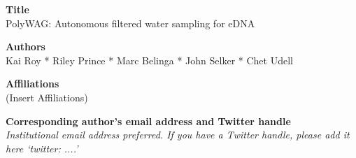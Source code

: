 \documentclass[11pt, letterpaper]{article}
\begin{document}
\begin{flushleft}



\setlength{\parindent}{0pt}
\setlength{\parskip}{10pt}

\textbf{Title} \\
PolyWAG: Autonomous filtered water sampling for eDNA 


\textbf{Authors} \\
Kai Roy * Riley Prince * Marc Belinga * John Selker * Chet Udell


\textbf{Affiliations} \\ 
(Insert Affiliations)


\textbf{Corresponding author’s email address and Twitter handle}\\ 
\textit{Institutional email address preferred. If you have a Twitter handle, please add it here ‘twitter: \@....’}


\end{flushleft}
\end{document}
